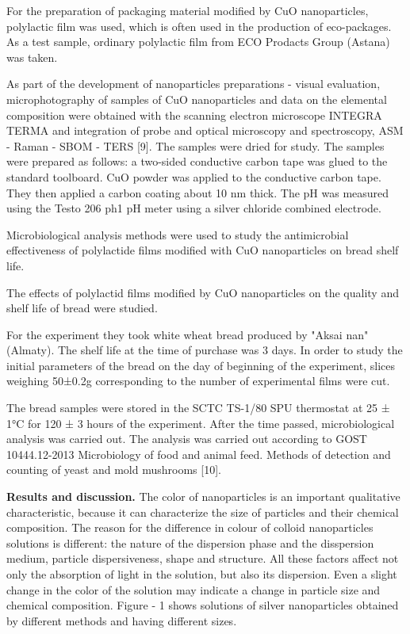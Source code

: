 \begin{multicols}{2}
For the preparation of packaging material modified by CuO nanoparticles,
polylactic film was used, which is often used in the production of
eco-packages. As a test sample, ordinary polylactic film from ECO
Prodacts Group (Astana) was taken.

As part of the development of nanoparticles preparations - visual
evaluation, microphotography of samples of CuO nanoparticles and data on
the elemental composition were obtained with the scanning electron
microscope INTEGRA TERMA and integration of probe and optical microscopy
and spectroscopy, ASM - Raman - SBOM - TERS {[}9{]}. The samples were
dried for study. The samples were prepared as follows: a two-sided
conductive carbon tape was glued to the standard toolboard. CuO powder
was applied to the conductive carbon tape. They then applied a carbon
coating about 10 nm thick. The pH was measured using the Testo 206 ph1
pH meter using a silver chloride combined electrode.

Microbiological analysis methods were used to study the antimicrobial
effectiveness of polylactide films modified with CuO nanoparticles on
bread shelf life.

The effects of polylactid films modified by CuO nanoparticles on the
quality and shelf life of bread were studied.

For the experiment they took white wheat bread produced by "Aksai nan"
(Almaty). The shelf life at the time of purchase was 3 days. In order to
study the initial parameters of the bread on the day of beginning of the
experiment, slices weighing 50±0.2g corresponding to the number of
experimental films were cut.

The bread samples were stored in the SCTC TS-1/80 SPU thermostat at 25 ±
1°C for 120 ± 3 hours of the experiment. After the time passed,
microbiological analysis was carried out. The analysis was carried out
according to GOST 10444.12-2013 Microbiology of food and animal feed.
Methods of detection and counting of yeast and mold mushrooms {[}10{]}.

{\bfseries Results and discussion.} The color of nanoparticles is an
important qualitative characteristic, because it can characterize the
size of particles and their chemical composition. The reason for the
difference in colour of colloid nanoparticles solutions is different:
the nature of the dispersion phase and the disspersion medium, particle
dispersiveness, shape and structure. All these factors affect not only
the absorption of light in the solution, but also its dispersion. Even a
slight change in the color of the solution may indicate a change in
particle size and chemical composition. Figure - 1 shows solutions of
silver nanoparticles obtained by different methods and having different
sizes.
\end{multicols}

